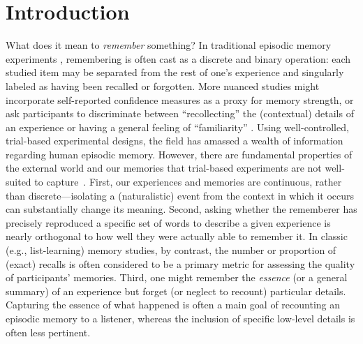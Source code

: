 \documentclass{article}
\begin{document}
\section*{Introduction}
What does it mean to \textit{remember} something? In traditional episodic memory experiments \citep[e.g., list-learning or trial-based experiments;][]{Murd62a, Kaha96}, remembering is often cast as a discrete and binary operation: each studied item may be separated from the rest of one's experience and singularly labeled as having been recalled or forgotten. More nuanced studies might incorporate self-reported confidence measures as a proxy for memory strength, or ask participants to discriminate between ``recollecting'' the (contextual) details of an experience or having a general feeling of ``familiarity'' \citep{Yone02}. Using well-controlled, trial-based experimental designs, the field has amassed a wealth of information regarding human episodic memory.  However, there are fundamental properties of the external world and our memories that trial-based experiments are not well-suited to capture~\citep[for review, also see][]{KoriGold94, HukEtal18}.  First, our experiences and memories are continuous, rather than discrete---isolating a (naturalistic) event from the context in which it occurs can substantially change its meaning.  Second, asking whether the rememberer has precisely reproduced a specific set of words to describe a given experience is nearly orthogonal to how well they were actually able to remember it.  In classic (e.g., list-learning) memory studies, by contrast, the number or proportion of (exact) recalls is often considered to be a primary metric for assessing the quality of participants' memories.  Third, one might remember the \textit{essence} (or a general summary) of an experience but forget (or neglect to recount) particular details.  Capturing the essence of what happened is often a main goal of recounting an episodic memory to a listener, whereas the inclusion of specific low-level details is often less pertinent.
\end{document}
